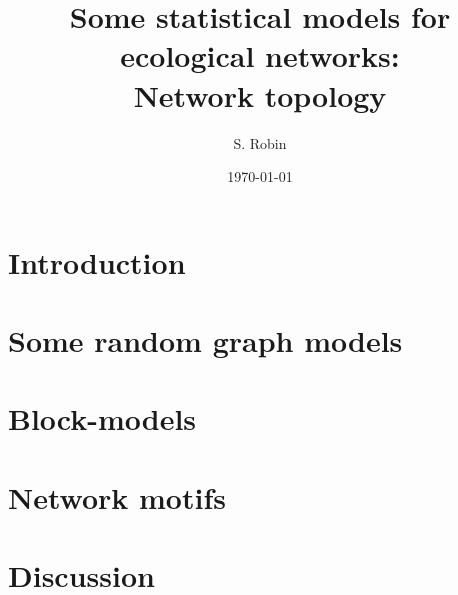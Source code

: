 \documentclass[9pt]{beamer}
\begin{document}
\title{Some statistical models for ecological networks: \\
  Network topology}
\author{S. Robin}
\date{\today}
\maketitle


\section{Introduction} 


\section{Some random graph models} 


\section{Block-models} 


\section{Network motifs} 


\section{Discussion} 


\backupbegin


% 
\backupend

\end{document}
